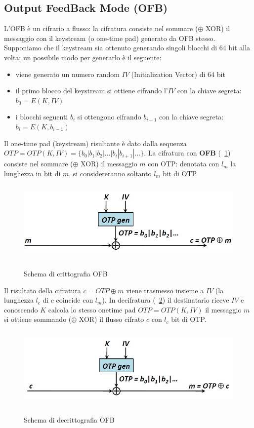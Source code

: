 \subsection{Output FeedBack Mode (OFB)} \label{par:ofb}
L'OFB è un cifrario a flusso: la cifratura consiste nel sommare ($\oplus$ XOR) il messaggio con il keystream (o one-time pad) generato da OFB stesso. Supponiamo che il keystream sia ottenuto generando singoli blocchi di 64 bit alla volta; un possibile modo per generarlo è il seguente:
\begin{itemize}
	\item viene generato un numero random $IV$ (Initialization Vector) di 64 bit
	\item il primo blocco del keystream si ottiene cifrando l'$IV$ con la chiave segreta: $b_{0} = E(K,IV)$
	\item i blocchi seguenti $b_{i}$ si ottengono cifrando $b_{i-1}$ con la chiave segreta: $b_{i} = E(K,b_{i-1})$
\end{itemize}
Il one-time pad (keystream) risultante è dato dalla sequenza $OTP = OTP(K, IV) = \{b_{0}|b_{1}|b_{2}|...|b_{i}|b_{i+1}|...\}$. La cifratura con \textbf{OFB} (\figurename ~\ref{fig:OFB_enc}) consiste nel sommare ($\oplus$ XOR) il messaggio $m$ con OTP: denotata con $l_{m}$ la lunghezza in bit di $m$, si considereranno soltanto $l_{m}$ bit di OTP.
\begin{figure}[htbp]
	\centering%
	\subfigure%
	{\includegraphics[height=4cm, width=12cm, keepaspectratio]{Immagini/modalita_operative/OFB_enc.png}}
	\caption{Schema di crittografia OFB \label{fig:OFB_enc}} 	
\end{figure}
Il risultato della cifratura $c = OTP \oplus m$ viene trasmesso insieme a $IV$ (la lunghezza $l_{c}$ di $c$ coincide con $l_{m}$).\newline
In decifratura (\figurename ~\ref{fig:OFB_dec}) il destinatario riceve $IV$ e conoscendo $K$ calcola lo stesso onetime pad $OTP = OTP(K, IV)$  il messaggio $m$ si ottiene sommando ($\oplus$ XOR) il flusso cifrato $c$ con $l_{c}$ bit di OTP.
\begin{figure}[htbp]
	\centering%
	\subfigure%
	{\includegraphics[height=4cm, width=12cm, keepaspectratio]{Immagini/modalita_operative/OFB_dec.png}}
	\caption{Schema di decrittografia OFB \label{fig:OFB_dec}} 	
\end{figure}
